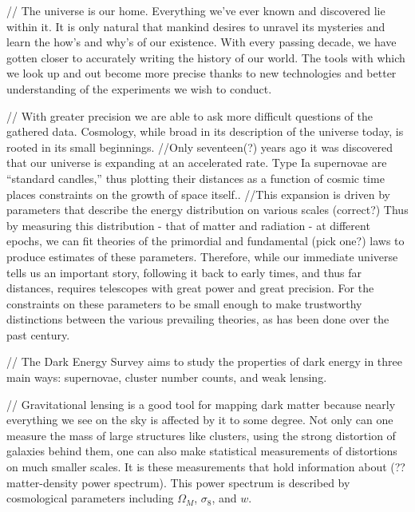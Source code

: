 \documentclass[12pt]{article}
\begin{document}
// The universe is our home. Everything we've ever known and discovered lie within it. It is only natural that mankind desires to unravel its mysteries and learn the how's and why's of our existence. With every passing decade, we have gotten closer to accurately writing the history of our world. The tools with which we look up and out become more precise thanks to new technologies and better understanding of the experiments we wish to conduct.

// With greater precision we are able to ask more difficult questions of the gathered data. Cosmology, while broad in its description of the universe today, is rooted in its small beginnings. %
//Only seventeen(?) years ago it was discovered that our universe is expanding at an accelerated rate. Type Ia supernovae are ``standard candles,'' thus plotting their distances as a function of cosmic time places constraints on the growth of space itself.. %
//This expansion is driven by parameters that describe the energy distribution on various scales (correct?) Thus by measuring this distribution - that of matter and radiation - at different epochs, we can fit theories of the primordial and fundamental (pick one?) laws to produce estimates of these parameters. Therefore, while our immediate universe tells us an important story, following it back to early times, and thus far distances, requires telescopes with great power and great precision. For the constraints on these parameters to be small enough to make trustworthy distinctions between the various prevailing theories, as has been done over the past century. %

// The Dark Energy Survey aims to study the properties of dark energy in three main ways: supernovae, cluster number counts, and weak lensing. %

// Gravitational lensing is a good tool for mapping dark matter because nearly everything we see on the sky is affected by it to some degree. Not only can one measure the mass of large structures like clusters, using the strong distortion of galaxies behind them, one can also make statistical measurements of distortions on much smaller scales. It is these measurements that hold information about (?? matter-density power spectrum). This power spectrum is described by cosmological parameters including $\Omega_{M}$, $\sigma_{8}$, and $w$. %
\end{document}
